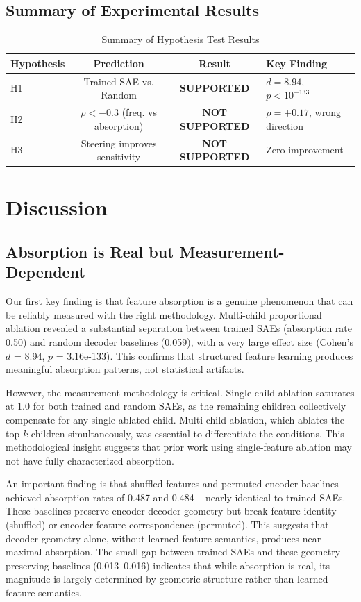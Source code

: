 \documentclass{article}
\begin{document}
\subsection{Summary of Experimental Results}

\begin{table}[t]
\caption{Summary of Hypothesis Test Results}
\label{tab:summary}
\centering
\begin{tabular}{lccp{3.2cm}}
\toprule
Hypothesis & Prediction & Result & Key Finding \\
\midrule
H1 & Trained SAE vs. Random & \textbf{SUPPORTED} & $d=8.94$, $p<10^{-133}$ \\
H2 & $\rho < -0.3$ (freq. vs absorption) & \textbf{NOT SUPPORTED} & $\rho=+0.17$, wrong direction \\
H3 & Steering improves sensitivity & \textbf{NOT SUPPORTED} & Zero improvement \\
\bottomrule
\end{tabular}
\end{table}


\section{Discussion}

\subsection{Absorption is Real but Measurement-Dependent}

Our first key finding is that feature absorption is a genuine phenomenon that can be reliably measured with the right methodology. Multi-child proportional ablation revealed a substantial separation between trained SAEs (absorption rate 0.50) and random decoder baselines (0.059), with a very large effect size (Cohen's $d$ = 8.94, $p$ = 3.16e-133). This confirms that structured feature learning produces meaningful absorption patterns, not statistical artifacts.

However, the measurement methodology is critical. Single-child ablation saturates at 1.0 for both trained and random SAEs, as the remaining children collectively compensate for any single ablated child. Multi-child ablation, which ablates the top-$k$ children simultaneously, was essential to differentiate the conditions. This methodological insight suggests that prior work using single-feature ablation may not have fully characterized absorption.

An important finding is that shuffled features and permuted encoder baselines achieved absorption rates of 0.487 and 0.484 -- nearly identical to trained SAEs. These baselines preserve encoder-decoder geometry but break feature identity (shuffled) or encoder-feature correspondence (permuted). This suggests that decoder geometry alone, without learned feature semantics, produces near-maximal absorption. The small gap between trained SAEs and these geometry-preserving baselines (0.013--0.016) indicates that while absorption is real, its magnitude is largely determined by geometric structure rather than learned feature semantics.
\end{document}
